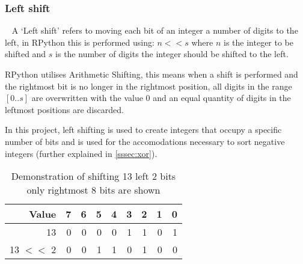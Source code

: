 \documentclass[12pt]{article}
\begin{document}
\subsubsection{Left shift}\
\label{sssec:leftshift}
A `Left shift' refers to moving each bit of an integer a number of digits to the left, in RPython this is performed using: $n << s$ where $n$ is the integer to be shifted and $s$ is the number of digits the integer should be shifted to the left.
\par
RPython utilises Arithmetic Shifting, this means when a shift is performed and the rightmost bit is no longer in the rightmost position, all digits in the range $[0 .. s]$ are overwritten with the value 0 and an equal quantity of digits in the leftmost positions are discarded.
\par
In this project, left shifting is used to create integers that occupy a specific number of bits and is used for the accomodations necessary to sort negative integers (further explained in \ref{sssec:xor}). 
\par

\begin{table}[htpb]
	\centering
\begin{tabular}{r|rrrrrrrr}
	
	\hline
	 Value   &   7 &   6 &   5 &   4 &   3 &   2 &   1 &   0 \\
	\hline
	 13      &   0 &   0 &   0 &   0 &   1 &   1 &   0 &   1 \\
	 13 \ensuremath{<}\ensuremath{<} 2 &   0 &   0 &   1 &   1 &   0 &   1 &   0 &   0 \\
	\hline
\end{tabular}
\caption{Demonstration of shifting 13 left 2 bits \\ only rightmost 8 bits are shown}
\end{table}
\pagebreak
\end{document}
